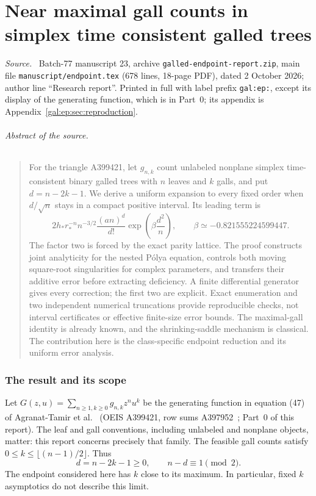 \documentclass[11pt,letterpaper]{article}
\numberwithin{equation}{section}
\theoremstyle{definition}\newtheorem{definition}[theorem]{Definition}
\theoremstyle{remark}\newtheorem{remark}[theorem]{Remark}
\newenvironment{partsource}{\par\medskip\noindent\begin{minipage}{\linewidth}\small\raggedright\textit{Source.}\ }{\end{minipage}\par\medskip}
\begin{document}
\part{Near maximal gall counts in simplex time consistent galled trees}\label{gal:part:ep}

\begin{partsource}
Batch-77 manuscript 23, archive \texttt{galled-endpoint-report.zip}, main file \texttt{manuscript/endpoint.tex} (678 lines, 18-page PDF), dated 2 October 2026; author line ``Research report''. Printed in full with label prefix \texttt{gal:ep:}, except its display of the generating function, which is in Part~0; its appendix is Appendix~\ref{gal:ep:sec:reproduction}.
\end{partsource}

\paragraph{Abstract of the source.}
\begin{quote}\small
For the triangle A399421, let $g_{n,k}$ count unlabeled nonplane simplex time-consistent binary galled trees with $n$ leaves and $k$ galls, and put $d=n-2k-1$. We derive a uniform expansion to every fixed order when $d/\sqrt n$ stays in a compact positive interval. Its leading term is
\[
2h_*r_*^{-n}n^{-3/2}\frac{(an)^d}{d!}
 \exp\!\left(\beta\frac{d^2}{n}\right),\qquad
\beta\simeq-0.821555224599447.
\]
The factor two is forced by the exact parity lattice. The proof constructs joint analyticity for the nested P\'olya equation, controls both moving square-root singularities for complex parameters, and transfers their additive error before extracting deficiency. A finite differential generator gives every correction; the first two are explicit. Exact enumeration and two independent numerical truncations provide reproducible checks, not interval certificates or effective finite-size error bounds. The maximal-gall identity is already known, and the shrinking-saddle mechanism is classical. The contribution here is the class-specific endpoint reduction and its uniform error analysis.
\end{quote}

\section{The result and its scope}\label{gal:ep:sec:result}
Let $G(z,u)=\sum_{n\ge1,k\ge0}g_{n,k}z^nu^k$ be the generating function in equation (47) of Agranat-Tamir et al.~\cite{comparison} (OEIS A399421, row sums A397952~\cite{oeis399421,oeis397952}; Part~0 of this report). The leaf and gall conventions, including unlabeled and nonplane objects, matter: this report concerns precisely that family. The feasible gall counts satisfy $0\le k\le\lfloor(n-1)/2\rfloor$. Thus
\begin{equation}\label{gal:ep:eq:deficiency}
d=n-2k-1\ge0,\qquad n-d\equiv1\pmod2.
\end{equation}
The endpoint considered here has $k$ close to its maximum. In particular, fixed $k$ asymptotics do not describe this limit.
\end{document}
